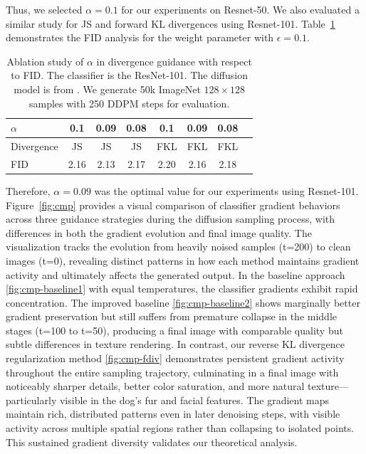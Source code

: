 \documentclass{article}
\begin{document}
Thus, we selected $\alpha = 0.1$ for our experiments on Resnet-50. We also evaluated a similar study for JS and forward KL divergences using Resnet-101. Table~\ref{tab:fid_alpha2} demonstrates the FID analysis for the weight parameter with $\epsilon = 0.1$.   

\begin{table}[h]
  \centering
  \caption{ Ablation study of $\alpha$ in divergence guidance with respect to FID. The classifier is the
ResNet-101. The diffusion model is from \cite{dhariwal2021diffusion}. We generate 50k
ImageNet $128\times128$ samples with 250 DDPM steps for evaluation.}
\vspace{5pt}
  \label{tab:fid_alpha2}
  \begin{tabular}{lccccccc}
    \toprule
    $\alpha$ & 0.1 & 0.09 & 0.08 & 0.1 & 0.09 & 0.08\\
    \midrule
        Divergence & JS &JS &JS & FKL& FKL& FKL\\
    \midrule
    FID      & 2.16&2.13&2.17&2.20&2.16&2.18\\
    \bottomrule
  \end{tabular}
\end{table}
Therefore, $\alpha = 0.09$ was the optimal value for our experiments using Resnet-101. Figure~\ref{fig:cmp} provides a visual comparison of classifier gradient behaviors across three guidance strategies during the diffusion sampling process, with differences in both the gradient evolution and final image quality. The visualization tracks the evolution from heavily noised samples (t=200) to clean images (t=0), revealing distinct patterns in how each method maintains gradient activity and ultimately affects the generated output. In the baseline approach \ref{fig:cmp-baseline1} with equal temperatures, the classifier gradients exhibit rapid concentration. The improved baseline \ref{fig:cmp-baseline2} shows marginally better gradient preservation but still suffers from premature collapse in the middle stages (t=100 to t=50), producing a final image with comparable quality but subtle differences in texture rendering. In contrast, our reverse KL divergence regularization method \ref{fig:cmp-fdiv} demonstrates persistent gradient activity throughout the entire sampling trajectory, culminating in a final image with noticeably sharper details, better color saturation, and more natural texture—particularly visible in the dog's fur and facial features. The gradient maps maintain rich, distributed patterns even in later denoising steps, with visible activity across multiple spatial regions rather than collapsing to isolated points. This sustained gradient diversity validates our theoretical analysis.
\end{document}
